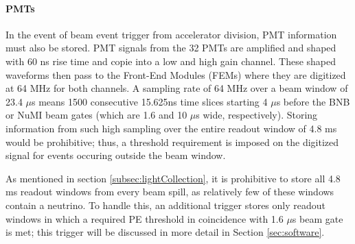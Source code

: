 \documentclass[12pt]{article}
\begin{document}
\paragraph{PMTs}
In the event of beam event trigger from accelerator division, PMT information must also be stored. PMT signals from the 32 PMTs are amplified and shaped with 60 ns rise time and copie into a low and high gain channel. These shaped waveforms then pass to the Front-End Modules (FEMs) where they are digitized at 64 MHz for both channels. A sampling rate of 64 MHz over a beam window of 23.4 $\mu$s means 1500 consecutive 15.625ns time slices starting 4 $\mu$s before the BNB or NuMI beam gates (which are 1.6 and 10 $\mu$s wide, respectively). Storing information from such high sampling over the entire readout window of 4.8 ms would be prohibitive; thus, a threshold requirement is imposed on the digitized signal for events occuring outside the beam window. \\
\par As mentioned in section \ref{subsec:lightCollection}, it is prohibitive to store all 4.8 ms readout windows from every beam spill, as relatively few of these windows contain a neutrino. To handle this, an additional trigger stores only readout windows in which a required PE threshold in coincidence with 1.6 $\mu$s beam gate is met; this trigger will be discussed in more detail in Section \ref{sec:software}.

\end{document}
